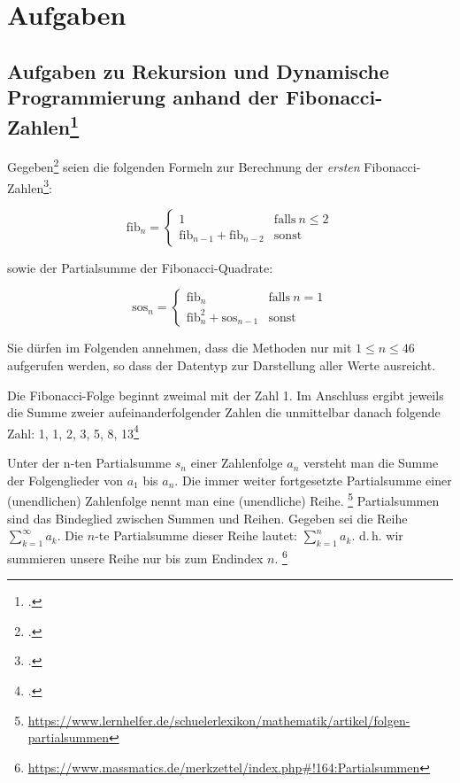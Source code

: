 \documentclass{lehramt-informatik}
\begin{document}
\chapter{Aufgaben}

%

\section{Aufgaben zu Rekursion und Dynamische Programmierung anhand der
Fibonacci-Zahlen\footcite[Seite 1]{aud:pu:3}}

Gegeben\footcite{examen:66115:2017:03} seien die folgenden Formeln zur
Berechnung der \emph{ersten}
Fibonacci-Zahlen\footcite{wiki:fibonacci-folge}:

\begin{equation*}
\text{fib}_n =
\begin{cases}
1 & \text{falls}\ n \leq 2\\
\text{fib}_{n-1} + \text{fib}_{n-2} & \text{sonst}
\end{cases}
\end{equation*}

sowie der Partialsumme der Fibonacci-Quadrate:

\begin{equation*}
\text{sos}_n =
\begin{cases}
\text{fib}_n & \text{falls}\ n = 1\\
\text{fib}_n^2 + \text{sos}_{n-1} & \text{sonst}
\end{cases}
\end{equation*}

\noindent
Sie dürfen im Folgenden annehmen, dass die Methoden nur mit $1 \leq n
\leq 46$ aufgerufen werden, so dass der Datentyp  zur
Darstellung aller Werte ausreicht.

\begin{exkurs}
Die Fibonacci-Folge beginnt zweimal mit der Zahl 1.
Im Anschluss ergibt jeweils die Summe zweier aufeinanderfolgender Zahlen
die unmittelbar danach folgende Zahl: 1, 1, 2, 3, 5, 8, 13\footcite{wiki:fibonacci-folge}
\end{exkurs}

\begin{exkurs}[Partialsumme]
Unter der n-ten Partialsumme $s_n$ einer Zahlenfolge $a_n$ versteht man
die Summe der Folgenglieder von $a_1$ bis $a_n$. Die immer
weiter fortgesetzte Partialsumme einer (unendlichen) Zahlenfolge nennt
man eine (unendliche) Reihe.
\footnote{\url{https://www.lernhelfer.de/schuelerlexikon/mathematik/artikel/folgen-partialsummen}}
Partialsummen sind das Bindeglied zwischen Summen und Reihen.
Gegeben sei die Reihe $\sum_{k = 1}^{\infty} a_k$.
Die $n$-te Partialsumme dieser Reihe lautet: $\sum_{k = 1}^{n} a_k$.
d.\,h. wir summieren unsere Reihe nur bis zum Endindex $n$.
\footnote{\url{https://www.massmatics.de/merkzettel/index.php\#!164:Partialsummen}}
\end{exkurs}
\end{document}
